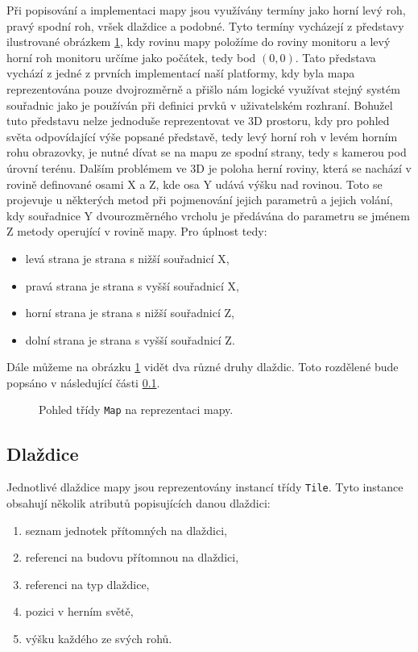 Při popisování a implementaci mapy jsou využívány termíny jako horní levý roh, pravý spodní roh, vršek dlaždice a podobné. Tyto termíny vycházejí z představy ilustrované obrázkem \ref{fig:mapreprelogic}, kdy rovinu mapy položíme do roviny monitoru a levý horní roh monitoru určíme jako počátek, tedy bod \((0,0)\). Tato představa vychází z jedné z prvních implementací naší platformy, kdy byla mapa reprezentována pouze dvojrozměrně a přišlo nám logické využívat stejný systém souřadnic jako je používán při definici prvků v uživatelském rozhraní. Bohužel tuto představu nelze jednoduše reprezentovat ve 3D prostoru, kdy pro pohled světa odpovídající výše popsané představě, tedy levý horní roh v levém horním rohu obrazovky, je nutné dívat se na mapu ze spodní strany, tedy s kamerou pod úrovní terénu. Dalším problémem ve 3D je poloha herní roviny, která se nachází v rovině definované osami X a Z, kde osa Y udává výšku nad rovinou. Toto se projevuje u některých metod při pojmenování jejich parametrů a jejich volání, kdy souřadnice Y dvourozměrného vrcholu je předávána do parametru se jménem Z metody operující v rovině mapy. Pro úplnost tedy:

\begin{itemize}
	\item levá strana je strana s nižší souřadnicí X,
	\item pravá strana je strana s vyšší souřadnicí X,
	\item horní strana je strana s nižší souřadnicí Z,
	\item dolní strana je strana s vyšší souřadnicí Z.
\end{itemize}

Dále můžeme na obrázku \ref{fig:mapreprelogic} vidět dva různé druhy dlaždic. Toto rozdělené bude popsáno v následující části \ref{sec:tiles}.

\begin{figure}[h]
	\centering
	\fontsize{8pt}{11pt}\selectfont
	\def\svgwidth{\textwidth}
	
	\caption{Pohled třídy \texttt{Map} na reprezentaci mapy.}
	\label{fig:mapreprelogic}
\end{figure}
\subsection{Dlaždice}
\label{sec:tiles}
Jednotlivé dlaždice mapy jsou reprezentovány instancí třídy \texttt{Tile}. Tyto instance obsahují několik atributů popisujících danou dlaždici:

\begin{enumerate}
	\item seznam jednotek přítomných na dlaždici,
	\item referenci na budovu přítomnou na dlaždici,
	\item referenci na typ dlaždice,
	\item pozici v herním světě,
	\item výšku každého ze svých rohů.
\end{enumerate}

